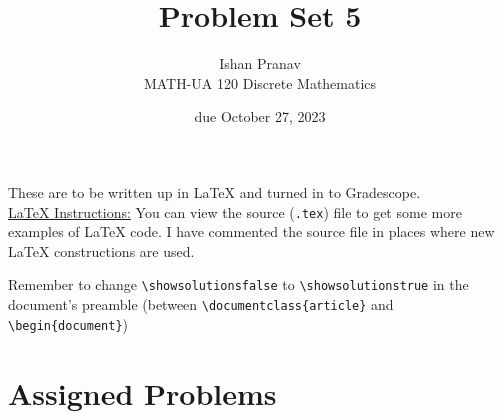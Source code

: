 \documentclass{article}
\title{Problem Set 5}
\author{
    Ishan Pranav
\\  MATH-UA 120 Discrete Mathematics
}
\date{due October 27, 2023}
\newif\ifshowsolutions
\newcommand{\danger}{\marginpar[\hfill\dbend]{\dbend\hfill}}
\theoremstyle{definition}
\begin{document}
\maketitle
These are to be written up in \LaTeX{} and turned in to Gradescope.\\
\ifshowsolutions
    \SetupExSheets{solution/print=true}
\else
    \danger
 \underline{ \LaTeX{}  Instructions:}  You can view the source (\texttt{.tex}) file to get some more examples of \LaTeX{} code.  I have commented the source file in places where new \LaTeX{} constructions are used.
  
  Remember to change \verb|\showsolutionsfalse| to \verb|\showsolutionstrue|
    in the document's preamble 
    (between \verb|\documentclass{article}| and \verb|\begin{document}|)
\fi

\section*{Assigned Problems}
\end{document}
